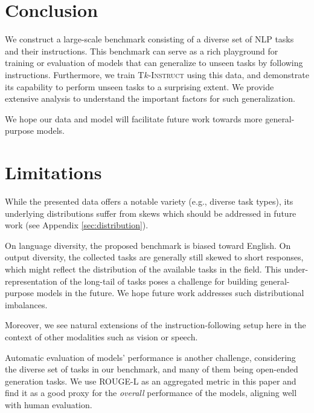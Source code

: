 \section{Conclusion}

We construct a large-scale benchmark consisting of a diverse set of NLP tasks and their instructions. This benchmark can serve as a rich playground for training or evaluation of models that can generalize to unseen tasks by following instructions. Furthermore, we train \textsc{T$k$-Instruct} using this data, and demonstrate its capability to perform unseen tasks to a surprising extent. We provide extensive analysis to understand the important factors for such generalization.

We hope our data and model will facilitate future work towards more general-purpose models. 

\section{Limitations}
While the presented data offers a notable variety (e.g., diverse task types), its underlying distributions suffer from skews which should be addressed in future work (see Appendix \ref{sec:distribution}). 

On language diversity, the proposed benchmark is biased toward English. On output diversity, the collected tasks are generally still skewed to short responses, which might reflect the distribution of the available tasks in the field. This under-representation of the long-tail of tasks poses a challenge for building general-purpose models in the future. We hope future work addresses such distributional imbalances. 

Moreover, we see natural extensions of the instruction-following setup here in the context of other modalities such as vision or speech. 

Automatic evaluation of models' performance is another challenge, considering the diverse set of tasks in our benchmark, and many of them being open-ended generation tasks. We use ROUGE-L as an aggregated metric in this paper and find it as a good proxy for the \emph{overall} performance of the models, aligning well with human evaluation. 

